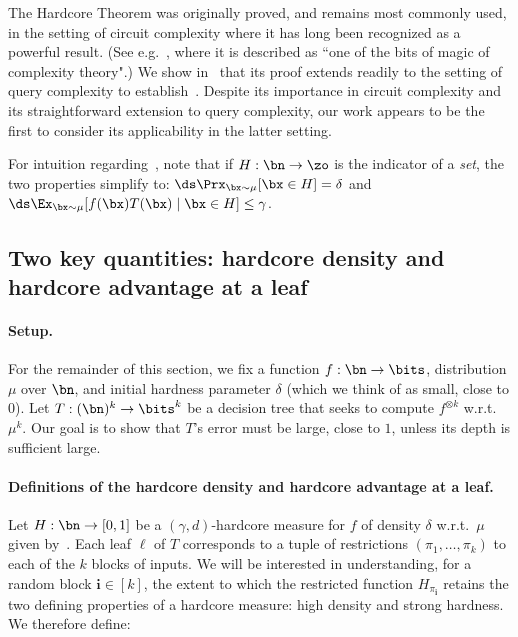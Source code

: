 The Hardcore Theorem was originally proved, and remains most commonly used, in the setting of circuit complexity where it has long been recognized as a powerful result. (See e.g.~\cite{Tre07}, where it is described as ``one of the bits of magic of complexity theory".) We show in~ that its proof extends readily to the setting of query complexity to establish~.  Despite its importance in circuit complexity and its straightforward extension to query complexity, our work appears to be the first to consider its applicability in the latter setting. 



\begin{remark}
For intuition regarding~, note that if $H : \bn \to \zo$ is the indicator of a {\sl set}, the two properties simplify to: 
 $\ds \Prx_{\bx \sim \mu}[\bx \in H] = \delta$ and 
$ \ds \Ex_{\bx\sim \mu}[f(\bx)T(\bx) \mid \bx \in H] \le \gamma$. 
    \end{remark}


    
\subsection{Two key quantities: hardcore density and hardcore advantage at a leaf}

\paragraph{Setup.} For the remainder of this section, we fix a function $f : \bn\to\bits$, distribution $\mu$ over $\bn$, and initial hardness parameter $\delta$ (which we think of as small, close to $0$). Let $T : (\bn)^k \to \bits^k$ be a decision tree that seeks to compute $f^{\otimes k}$ w.r.t.~$\mu^k$.   Our goal is to show that $T$'s error must be large, close to $1$, unless its depth is sufficient large.

\paragraph{Definitions of the hardcore density and hardcore advantage at a leaf.} Let $H : \bn\to [0,1]$ be a $(\gamma,d)$-hardcore measure for $f$ of density $\delta$ w.r.t.~$\mu$ given by~.  Each leaf $\ell$ of $T$ corresponds to a tuple of restrictions $(\pi_1,\ldots,\pi_k)$ to each of the $k$ blocks of inputs. We will be interested in understanding, for a random block $\boldsymbol{i}\in [k]$, the extent to which the restricted function $H_{\pi_{\boldsymbol{i}}}$ retains the two defining properties of a hardcore measure: high density and strong hardness. We therefore define: 


